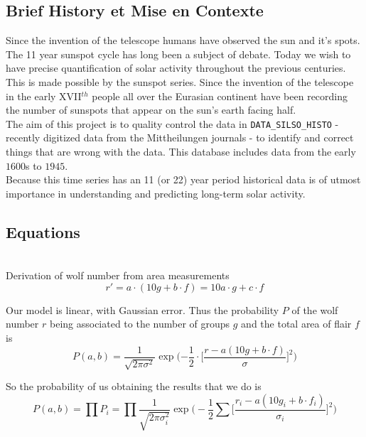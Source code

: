 \documentclass[12pt]{article}
\begin{document}
    
\subsection{Brief History et Mise en Contexte}

Since the invention of the telescope humans have observed the sun and it's spots. The 11 year sunspot cycle has long been a subject of debate. Today we wish to have precise quantification of solar activity throughout the previous centuries. This is made possible by the sunspot series. Since the invention of the telescope in the early XVII$^{th}$ people all over the Eurasian continent have been recording the number of sunspots that appear on the sun's earth facing half. \\

The aim of this project is to quality control the data in \texttt{DATA\_SILSO\_HISTO} - recently digitized data from the Mittheilungen journals - to identify and correct things that are wrong with the data. This database includes data from the early $1600$s to $1945$.\\

Because this time series has an 11 (or 22) year period historical data is of utmost importance in understanding and predicting long-term solar activity. \\

\subsection{Equations}\\

Derivation of wolf number from area measurements
\begin{equation}\label{equation:derivde wolf}
    r' = a\cdot(10 g + b\cdot f) = 10 a\cdot g + c\cdot f
\end{equation}

Our model is linear, with Gaussian error. Thus the probability $P$ of the wolf number $r$ being associated to the number of groups $g$ and the total area of flair $f$ is
\begin{equation}\label{equation:wolf probability}
    P(a,b) = \frac{1}{\sqrt{2\pi\sigma^2}} \exp\bigg( {-\frac{1}{2}\cdot \Big[ \frac{r - a(10g+b\cdot f)}{\sigma} \Big]^2} \bigg)
\end{equation}

So the probability of us obtaining the results that we do is
\begin{equation}\label{equation:wolf total probability}
    P(a,b) = \prod P_i = \prod \frac{1}{\sqrt{2\pi\sigma_i^2}} 
    \exp \bigg( -\frac{1}{2} \sum \Big[ \frac{r_i - a(10g_i+b\cdot f_i)}{\sigma_i} \Big]^2 \bigg)
\end{equation}
\end{document}
